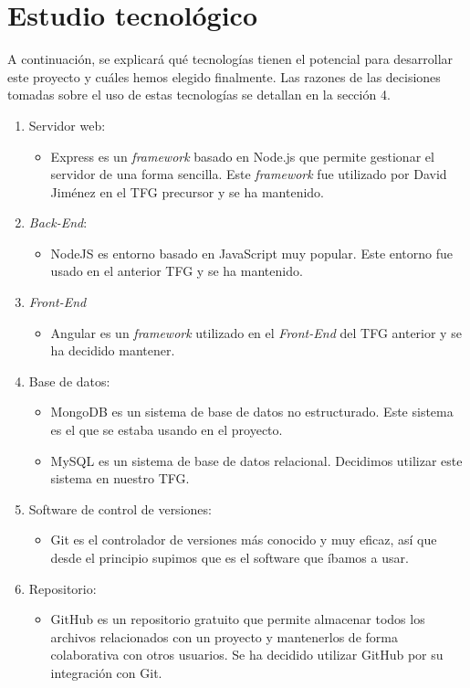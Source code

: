 \documentclass[11pt]{book}
\begin{document}
	\section{Estudio tecnológico}
	A continuación, se explicará qué tecnologías tienen el potencial para desarrollar este proyecto y cuáles hemos elegido finalmente. Las razones de las decisiones tomadas sobre el uso de estas tecnologías se detallan en la sección 4.
	\begin{enumerate} 
		\item Servidor web:
		\begin{itemize} 
			\item Express es un \textit{framework} basado en Node.js que permite gestionar el servidor de una forma sencilla. Este \textit{framework} fue utilizado por David Jiménez en el TFG precursor y se ha mantenido.
		\end{itemize}
		\item \emph{Back-End}: 
		\begin{itemize} 
			\item NodeJS es entorno basado en JavaScript muy popular. Este entorno fue usado en el anterior TFG y se ha mantenido.
		\end{itemize}
		\item \emph{Front-End}
		\begin{itemize} 
			\item Angular es un \textit{framework} utilizado en el \textit{ Front-End } del TFG anterior y se ha decidido mantener.
		\end{itemize}
		\item Base de datos: 
		\begin{itemize} 
			\item MongoDB es un sistema de base de datos no estructurado. Este sistema es el que se estaba usando en el proyecto.
			\item MySQL es un sistema de base de datos relacional. Decidimos utilizar este sistema en nuestro TFG.
		\end{itemize}
		\item Software de control de versiones:
		\begin{itemize} 
			\item Git es el controlador de versiones más conocido y muy eficaz, así que desde el principio supimos que es el software que íbamos a usar. 
		\end{itemize}
		\item Repositorio: 
		\begin{itemize} 
			\item GitHub es un repositorio gratuito que permite almacenar todos los archivos relacionados con un proyecto y mantenerlos de forma colaborativa con otros usuarios. Se ha decidido utilizar GitHub por su integración con Git.

\end{itemize}
\end{enumerate}
\end{document}

